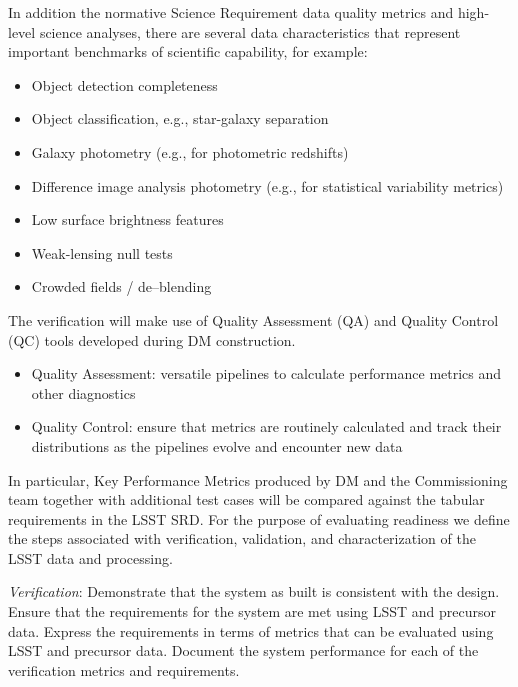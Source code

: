 In addition the normative Science Requirement data quality metrics and high-level science analyses, there are several data characteristics that represent important benchmarks of scientific capability, for example:

\begin{itemize}

	\item  Object detection completeness
	\item  Object classification, e.g., star-galaxy separation
	\item  Galaxy photometry (e.g., for photometric redshifts)
	\item  Difference image analysis photometry (e.g., for statistical variability metrics)
	\item  Low surface brightness features
	\item  Weak-lensing null tests
	\item  Crowded fields / de--blending
	
\end{itemize}

The verification will make use of Quality Assessment (QA) and Quality Control (QC) tools developed during DM construction.

\begin{itemize}

	\item Quality Assessment: versatile pipelines to calculate performance metrics and other diagnostics
	\item Quality Control: ensure that metrics are routinely calculated and track their distributions as the pipelines evolve and encounter new data
	
\end{itemize}

In particular, Key Performance Metrics produced by DM and the Commissioning team together with additional test cases will be compared against the tabular requirements in the LSST SRD.   For the purpose of evaluating readiness we define the steps associated with verification, validation, and characterization of the LSST data and processing.

\emph{Verification}: Demonstrate that the system as built is consistent with the design. Ensure that the requirements for the system are met using LSST and precursor data. Express the requirements in terms of metrics that can be evaluated using LSST and precursor data. Document the system performance for each of the verification metrics and requirements.

